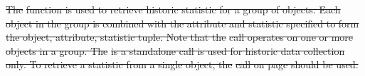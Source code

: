 \documentclass[12pt]{report} %
\providecommand{\DIFdeltex}[1]{{\protect\color{red}\sout{#1}}}                      %
\providecommand{\DIFdelbegin}{} %
\providecommand{\DIFdel}[1]{\texorpdfstring{\DIFdeltex{#1}}{}} %
\newcommand{\DIFscaledelfig}{0.5}
\newlength{\DIFdelgraphicswidth} %
\newlength{\DIFdelgraphicsheight} %
\newcommand{\DIFdelincludegraphics}[2][]{%
\sbox{\DIFdelgraphicsbox}{\DIFOincludegraphics[#1]{#2}}%
\settoboxwidth{\DIFdelgraphicswidth}{\DIFdelgraphicsbox} %
\settoboxtotalheight{\DIFdelgraphicsheight}{\DIFdelgraphicsbox} %
\scalebox{\DIFscaledelfig}{%
\parbox[b]{\DIFdelgraphicswidth}{\usebox{\DIFdelgraphicsbox}\\[-\baselineskip] \rule{\DIFdelgraphicswidth}{0em}}\llap{\resizebox{\DIFdelgraphicswidth}{\DIFdelgraphicsheight}{%
\setlength{\unitlength}{\DIFdelgraphicswidth}%
\begin{picture}(1,1)%
\thicklines\linethickness{2pt} %
{\color[rgb]{1,0,0}\put(0,0){\framebox(1,1){}}}%
{\color[rgb]{1,0,0}\put(0,0){\line( 1,1){1}}}%
{\color[rgb]{1,0,0}\put(0,1){\line(1,-1){1}}}%
\end{picture}%
}\hspace*{3pt}}} %
} %
\DeclareRobustCommand{\DIFdelbegin}{\DIFOdelbegin \let\includegraphics\DIFdelincludegraphics} %
\begin{document}
\DIFdelbegin %

\DIFdel{The }%
\DIFdel{function is used to retrieve historic statistic for a group of objects. 
Each object in the group is combined with the attribute and statistic specified to form the object, attribute, statistic tuple.
Note that the }%
\DIFdel{call operates on one or more objects in a group.
The }%
\DIFdel{is a standalone call is used for historic data collection only.
To retrieve a statistic from a single object, the }%
\DIFdel{call on page \pageref{func:ObjGetStat} should be used.
}%

\end{document}

